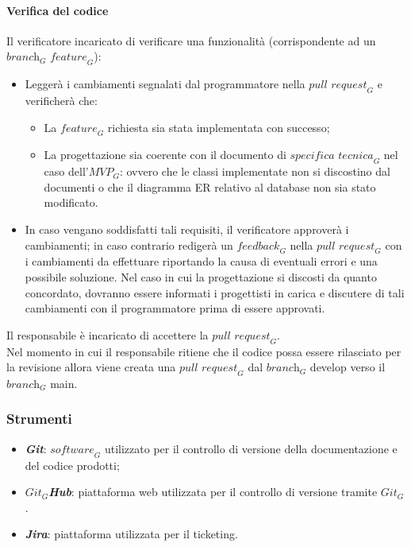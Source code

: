 \paragraph{Verifica del codice}
Il verificatore incaricato di verificare una funzionalità (corrispondente ad un $\textit{branch}_G$ $\textit{feature}_G$):
\begin{itemize}
    \item Leggerà i cambiamenti segnalati dal programmatore nella $\textit{pull request}_G$ e verificherà che:
    \begin{itemize}
        \item La $\textit{feature}_G$ richiesta sia stata implementata con successo;
        \item La progettazione sia coerente con il documento di $\textit{specifica tecnica}_G$ nel caso dell'$\textit{MVP}_G$: ovvero che le classi implementate non si discostino dal documenti o che il diagramma ER relativo al database non sia stato modificato.
    \end{itemize}
    \item In caso vengano soddisfatti tali requisiti, il verificatore approverà i cambiamenti; in caso contrario redigerà un $\textit{feedback}_G$ nella $\textit{pull request}_G$ con i cambiamenti da effettuare riportando la causa di eventuali errori e una possibile soluzione. Nel caso in cui la progettazione si discosti da quanto concordato, dovranno essere informati i progettisti in carica e discutere di tali cambiamenti con il programmatore prima di essere approvati.
\end{itemize}
Il responsabile è incaricato di accettere la $\textit{pull request}_G$. \\
Nel momento in cui il responsabile ritiene che il codice possa essere rilasciato per la revisione allora viene creata una $\textit{pull request}_G$ dal $\textit{branch}_G$ develop verso il $\textit{branch}_G$ main.
\subsubsection{Strumenti}
\begin{itemize}
    \item \emph{\textbf{Git}}: $\textit{software}_G$ utilizzato per il controllo di versione della documentazione e del codice prodotti;
    \item \emph{\textbf{$\textit{Git}_G$Hub}}: piattaforma web utilizzata per il controllo di versione tramite $\textit{Git}_G$.
    \item \emph{\textbf{Jira}}: piattaforma utilizzata per il ticketing.
\end{itemize}
